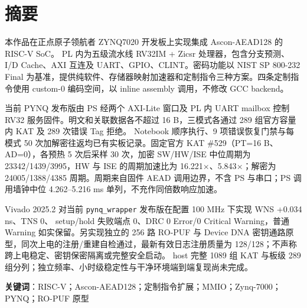 \chapter*{摘要}

本作品在正点原子领航者 ZYNQ7020 开发板上实现集成 Ascon-AEAD128 的 RISC-V SoC。 PL 内为五级流水线 RV32IM + Zicsr 处理器，包含分支预测、I/D Cache、AXI 互连及 UART、GPIO、CLINT。密码功能以 NIST SP 800-232 Final 为基准，提供纯软件、存储器映射加速器和定制指令三种方案。四条定制指令使用 custom-0 编码空间，以 inline assembly 调用，不修改 GCC backend。

当前 PYNQ 发布版由 PS 经两个 AXI-Lite 窗口及 PL 内 UART mailbox 控制 RV32 服务固件。明文和关联数据各不超过 16 B，三模式各通过 289 组官方容量内 KAT 及 289 次错误 Tag 拒绝。 Notebook 顺序执行、9 项错误恢复门禁与每模式 50 次加解密往返均已有实板记录。固定官方 KAT \#529（PT=16 B、AD=0），各预热 5 次后采样 30 次，加密 SW/HW/ISE 中位周期为 23342/1439/3995，HW 与 ISE 的周期加速比为 16.221$\times$、5.843$\times$；解密为 24005/1388/4385 周期。周期来自固件 AEAD 调用边界，不含 PS 与串口；PS 调用墙钟中位 4.262--5.216 ms 单列，不充作同倍数响应加速。

Vivado 2025.2 对当前 \texttt{pynq\_\allowbreak{}wrapper} 发布版在配置 100 MHz 下实现 WNS +0.034 ns、TNS 0、 setup/hold 失败端点 0、DRC 0 Error/0 Critical Warning，普通 Warning 如实保留。另实现独立的 256 路 RO-PUF 与 Device DNA 密钥通路原型，同次上电的注册/重建自检通过，最新有效日志注册质量为 128/128；不声称跨上电稳定、密钥保密隔离或完整安全启动。 host 完整 1089 组 KAT 与板级 289 组分列；独立频率、小时级稳定性与干净环境端到端复现尚未完成。

\textbf{关键词}：RISC-V；Ascon-AEAD128；定制指令扩展；MMIO；Zynq-7000；PYNQ；RO-PUF 原型
